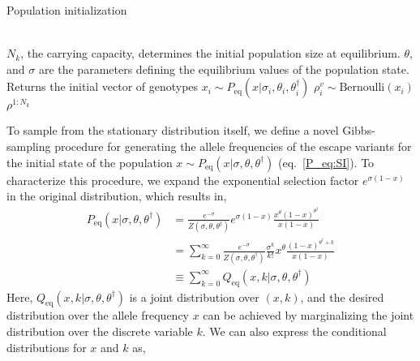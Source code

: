 \documentclass[11pt]{article}
\newcommand{\eq}{{\text{eq}}}
\newcommand{\CommentG}[1]{{\color{gray}\Comment #1}}
\begin{document}
\begin{algorithm}[h!]
\caption{Population initialization} \label{alg:popinit}
\begin{algorithmic}
\\ 
\CommentG{$N_k$, the carrying capacity, determines the initial population size at equilibrium. $\theta$, and $\sigma$ are the parameters defining the equilibrium values of the population state. Returns the initial vector of genotypes}
	\State $x_i \sim P_\eq(x|\sigma_i,\theta_i,\theta^\dagger_i)$ 
\EndFor
{}
	$\rho^{v}_i \sim \text{Bernoulli}(x_i)$ 
\EndFor \\
\Return $\rho^{1:N_k}$ 
\EndProcedure
\end{algorithmic}
\end{algorithm}

To sample from the stationary  distribution itself, we define a novel Gibbs-sampling procedure \cite{gemanStochasticRelaxationGibbs1984a} for generating the allele frequencies of the escape variants for the initial state of the population $x \sim P_\eq(x|\sigma,\theta,\theta^\dagger)$ (eq.~\ref{P_eq:SI}). To characterize this procedure, we expand the exponential selection factor  $e^{\sigma (1-x)}$ in the original distribution, which results in,
 \begin{align}
\nonumber P_\eq(x|\sigma,\theta,\theta^\dagger)  &= \frac{e^{-\sigma}}{Z(\sigma,\theta,\theta^\dagger)} e^{\sigma (1-x)}  \frac{ x^{\theta}  (1-x)^{\theta^\dagger} }{x(1-x)}\\
\nonumber &=  \sum_{k=0}^\infty \frac{ e^{-\sigma} }{Z(\sigma,\theta,\theta^\dagger)}    \frac{\sigma^k}{k!}  x^{\theta} \frac{(1-x)^{\theta^\dagger+k} }{x(1-x)}\\
& \equiv  \sum_{k=0}^\infty Q_\eq(x,k |\sigma,\theta,\theta^\dagger)
\end{align}
Here, $Q_\eq(x,k |\sigma,\theta,\theta^\dagger)$ is a joint distribution over $(x,k)$, and the desired distribution over the allele frequency $x$ can be achieved by marginalizing the joint distribution over the discrete variable $k$. We can also express the conditional distributions for $x$ and $k$ as, 
\end{document}
